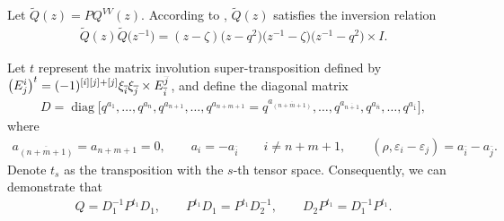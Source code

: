 \documentclass[pdftex]{sigma}
\numberwithin{equation}{section}
\begin{document}
\begin{Remark}
Let $\widetilde{Q}(z)=PQ^{VV}(z)$. According to \cite{WGMJ}, $\widetilde{Q}(z)$ satisfies the inversion relation
\begin{gather*}
 \widetilde{Q}(z)\widetilde{Q}\bigl(z^{-1}\bigr)=(z-\zeta)\bigl(z-q^2\bigr)\bigl(z^{-1}-\zeta\bigr)\bigl(z^{-1}-q^2\bigr)\times I.
\end{gather*}
\end{Remark}



Let $t$ represent the matrix involution super-transposition defined by
$
\bigl(E_j^i\bigr)^t=(-1)^{[i][j]+[j]}\xi_{\overline{i}}\xi_{\overline{j}}\allowbreak\times\smash{ E_{\overline{i}}^{\overline{j}}}$,
 and define the diagonal matrix
 \begin{gather*}
 D=\operatorname{diag}\bigl[q^{a_1},\dots,q^{a_n},q^{a_{n+1}},\dots, q^{a_{n+m+1}}=q^{a_{\overline{(n+m+1)}}},\dots,
 q^{a_{\overline{n+1}}},q^{a_{\overline{n}}},\dots,q^{a_{\overline{1}}}\bigr],
 \end{gather*}
 where
\begin{gather*}
 a_{\overline{(n+m+1)}}=a_{n+m+1}=0,\qquad a_i=-a_{\overline{i}} \qquad i\neq n+m+1,\qquad (\rho, \varepsilon_i-\varepsilon_j)=a_{\bar{i}}-a_{\bar{j}}.
\end{gather*}
Denote $t_s$ as the transposition with the $s$-th tensor space.
Consequently, we can demonstrate that
\begin{gather}\label{d5}
 Q=D_1^{-1}P^{t_1}D_1, \qquad P^{t_1}D_1=P^{t_1}D_2^{-1}, \qquad D_2P^{t_1}=D_1^{-1}P^{t_1}.
\end{gather}
\end{document}
